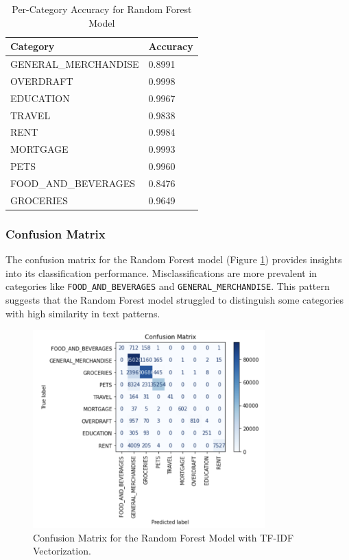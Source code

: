\documentclass[12pt,letterpaper]{article}
\begin{document}
\begin{table}[h]
    \centering
    \begin{tabular}{ll}
        \hline
        \textbf{Category} & \textbf{Accuracy} \\
        \hline
        GENERAL\_MERCHANDISE & 0.8991 \\
        OVERDRAFT & 0.9998 \\
        EDUCATION & 0.9967 \\
        TRAVEL & 0.9838 \\
        RENT & 0.9984 \\
        MORTGAGE & 0.9993 \\
        PETS & 0.9960 \\
        FOOD\_AND\_BEVERAGES & 0.8476 \\
        GROCERIES & 0.9649 \\
        \hline
    \end{tabular}
    \caption{Per-Category Accuracy for Random Forest Model}
    \label{table:category_accuracy_rf}
\end{table}

\subsubsection{Confusion Matrix}
The confusion matrix for the Random Forest model (Figure \ref{fig:confusion_matrix_rf}) provides insights into its classification performance. Misclassifications are more prevalent in categories like \texttt{FOOD\_AND\_BEVERAGES} and \texttt{GENERAL\_MERCHANDISE}. This pattern suggests that the Random Forest model struggled to distinguish some categories with high similarity in text patterns.

\begin{figure}[h]
    \centering
    \includegraphics[width=0.8\textwidth]{figure/random_forest_confusion.png}
    \caption{Confusion Matrix for the Random Forest Model with TF-IDF Vectorization.}
    \label{fig:confusion_matrix_rf}
\end{figure}
\end{document}
